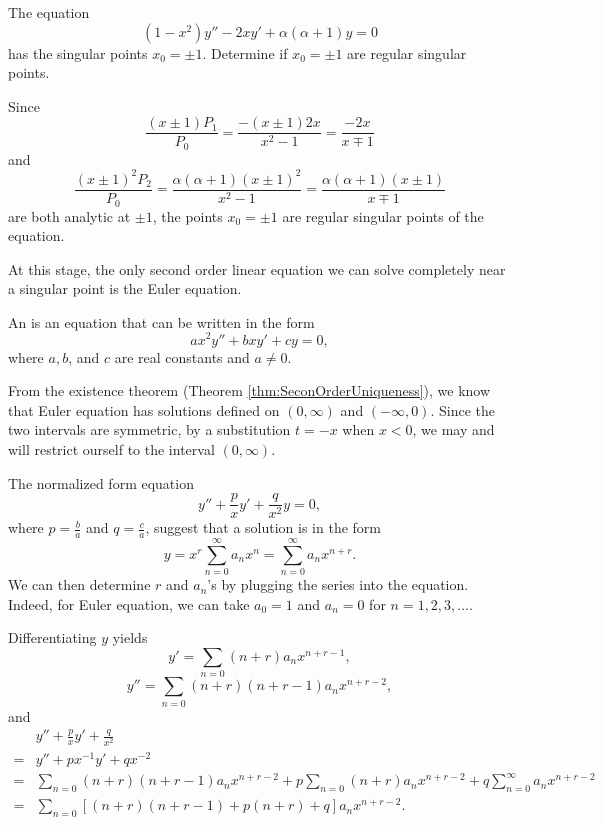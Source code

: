 \begin{exercise}

The equation
\[(1-x^2)y''-2xy'+\alpha(\alpha+1)y=0\]
has the singular points $x_0=\pm1$. Determine if $x_0=\pm 1$ are regular singular points.
\end{exercise}
\begin{exersol}
Since
\[\frac{(x\pm 1)P_1}{P_0}=\frac{-(x\pm 1)2x}{x^2-1}=\frac{-2x}{x\mp 1}\]
and
\[\frac{(x\pm 1)^2P_2}{P_0}=\frac{\alpha(\alpha+1)(x\pm 1)^2}{x^2-1}=\frac{\alpha(\alpha+1)(x\pm 1)}{x\mp 1}\]
are both analytic at $\pm 1$, the points $x_0=\pm 1$ are regular singular points of the equation.
\end{exersol}

At this stage, the only second order linear equation we can solve completely near a singular point is the Euler equation.

\begin{definition}
  An  is an equation that can be written in the form
  \[ax^2y''+bxy'+cy=0,\]
  where $a,b$, and $c$ are real constants and $a\ne 0$.
\end{definition}

From the existence theorem (Theorem \ref{thm:SeconOrderUniqueness}), we know that Euler equation has solutions defined on $(0,\infty)$ and $(-\infty,0)$. Since the two intervals are symmetric, by a substitution $t=-x$ when $x<0$, we may and will restrict ourself to the interval $(0, \infty)$.

The normalized form equation
\[y''+\frac{p}{x}y'+\frac{q}{x^2}y=0,\]
where $p=\frac{b}{a}$ and $q=\frac{c}{a}$, suggest that a solution is in the form
\[y=x^r\sum\limits_{n=0}^\infty a_nx^n=\sum\limits_{n=0}^\infty a_nx^{n+r}.\]
We can then determine $r$ and $a_n$'s by plugging the series into the equation. Indeed, for Euler equation, we can take $a_0=1$ and $a_n=0$ for $n=1, 2, 3, \dots$.

Differentiating $y$ yields
\[y'=\sum\limits_{n=0}(n+r)a_nx^{n+r-1},\]
\[y''=\sum\limits_{n=0}(n+r)(n+r-1)a_nx^{n+r-2},\]
and
\[
\begin{aligned}
  &y''+\frac{p}{x}y'+\frac{q}{x^2}\\
  =&y''+px^{-1}y'+qx^{-2}\\
  =&\sum\limits_{n=0}(n+r)(n+r-1)a_nx^{n+r-2}+p\sum\limits_{n=0}(n+r)a_nx^{n+r-2}+q\sum\limits_{n=0}^\infty a_nx^{n+r-2}\\
  =&\sum\limits_{n=0}[(n+r)(n+r-1)+p(n+r)+q]a_nx^{n+r-2}.
\end{aligned}  
\]

